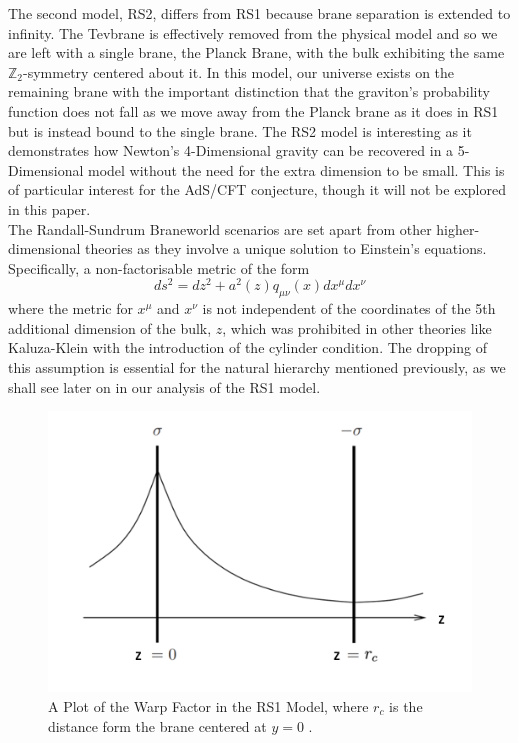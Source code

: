 \documentclass[11pt]{report}
\numberwithin{equation}{chapter}
\begin{document}
The second model, RS2, differs from RS1 because brane separation is extended to infinity. The Tevbrane is effectively removed from the physical model and so we are left with a single brane, the Planck Brane, with the bulk exhibiting the same  $\mathbb{Z}_2$-symmetry centered about it. In this model, our universe exists on the remaining brane with the important distinction that the graviton's probability function does not fall as we move away from the Planck brane as it does in RS1 but is instead bound to the single brane. 
The RS2 model is interesting as it demonstrates how Newton's 4-Dimensional gravity can be recovered in a 5-Dimensional model without the need for the extra dimension to be small. This is of particular interest for the AdS/CFT conjecture, though it will not be explored in this paper.\\

The Randall-Sundrum Braneworld scenarios are set apart from other higher-dimensional theories as they involve a unique solution to Einstein's equations. Specifically, a non-factorisable metric of the form
\begin{equation}
ds^2= dz^{2} + a^{2}(z) q _{\mu\nu}(x) dx^{\mu} dx^{\nu}   
\end{equation}
where the metric for $x^{\mu}$ and $x^{\nu}$ is not independent of the coordinates of the 5th additional dimension of the bulk, $z$, which was prohibited in other theories like Kaluza-Klein with the introduction of the cylinder condition. The dropping of this assumption is essential for the natural hierarchy mentioned previously, as we shall see later on in our analysis of the RS1 model. \\

\begin{figure}[h]
\centering
    \includegraphics[scale=0.6]{Images/RS1 warp factor.png}
    \caption{A Plot of the Warp Factor in the RS1 Model, where $r_c$ is the distance form the brane centered at $y=0$ \cite{Figures}.}
    \label{fig:RS1}
\end{figure}
\end{document}
